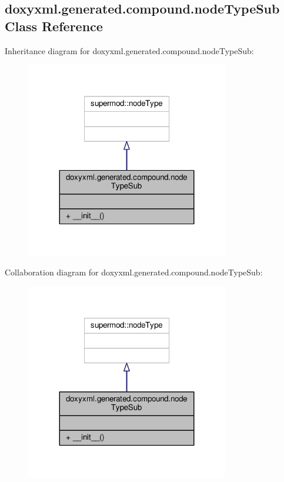 \subsection{doxyxml.\+generated.\+compound.\+node\+Type\+Sub Class Reference}
\label{classdoxyxml_1_1generated_1_1compound_1_1nodeTypeSub}


Inheritance diagram for doxyxml.\+generated.\+compound.\+node\+Type\+Sub\+:
\nopagebreak
\begin{figure}[H]
\begin{center}
\leavevmode
\includegraphics[width=251pt]{d9/d18/classdoxyxml_1_1generated_1_1compound_1_1nodeTypeSub__inherit__graph}
\end{center}
\end{figure}


Collaboration diagram for doxyxml.\+generated.\+compound.\+node\+Type\+Sub\+:
\nopagebreak
\begin{figure}[H]
\begin{center}
\leavevmode
\includegraphics[width=251pt]{de/dcf/classdoxyxml_1_1generated_1_1compound_1_1nodeTypeSub__coll__graph}
\end{center}
\end{figure}
